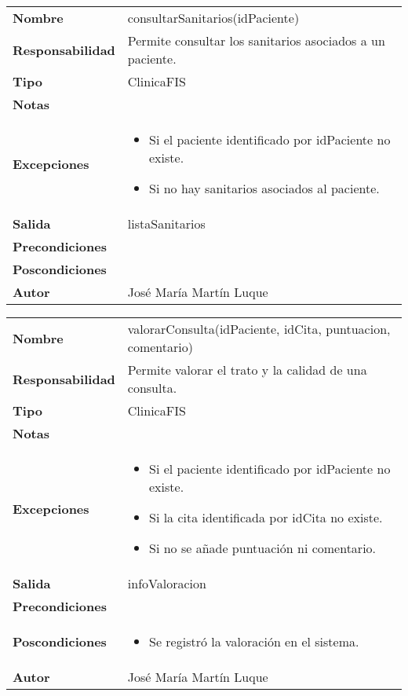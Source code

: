 \documentclass[11pt,a4paper]{article}
\newenvironment{itemizenomargins}
    {\begin{minipage}[t]{1\linewidth}\begin{itemize}}
    {\end{itemize}\end{minipage}}
\begin{document}
\begin{table}[H]
	\centering
	\label{anular-cita}
	\begin{tabularx}{\textwidth}{l|X}
    \textbf{Nombre}          & consultarSanitarios(idPaciente)\\
		\textbf{Responsabilidad} & Permite consultar los sanitarios asociados a un paciente. \\
		\textbf{Tipo}            & ClinicaFIS \\
		\textbf{Notas}           &  \\
		\textbf{Excepciones}     & 
		\begin{itemizenomargins}
			\item Si el paciente identificado por idPaciente no existe.
      \item Si no hay sanitarios asociados al paciente.
		\end{itemizenomargins} \\
		\textbf{Salida}          &  listaSanitarios\\
		\textbf{Precondiciones}  &  \\
		\textbf{Poscondiciones}  & \\
		\textbf{Autor}			 & José María Martín Luque
	\end{tabularx}
\end{table}


\begin{table}[H]
	\centering
	\label{anular-cita}
	\begin{tabularx}{\textwidth}{l|X}
    \textbf{Nombre}          & valorarConsulta(idPaciente, idCita, puntuacion, comentario)\\
		\textbf{Responsabilidad} & Permite valorar el trato y la calidad de una consulta. \\
		\textbf{Tipo}            & ClinicaFIS \\
		\textbf{Notas}           &  \\
		\textbf{Excepciones}     & 
		\begin{itemizenomargins}
			\item Si el paciente identificado por idPaciente no existe.
      \item Si la cita identificada por idCita no existe.
      \item Si no se añade puntuación ni comentario.
		\end{itemizenomargins} \\
		\textbf{Salida}          &  infoValoracion\\
		\textbf{Precondiciones}  &  \\
		\textbf{Poscondiciones}  & 
		\begin{itemizenomargins}
			\item Se registró la valoración en el sistema.
		\end{itemizenomargins} \\
		\textbf{Autor}			 & José María Martín Luque
	\end{tabularx}
\end{table}
\end{document}
